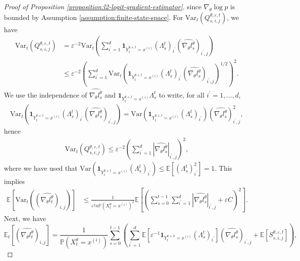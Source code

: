 \documentclass[11pt]{article}
\numberwithin{equation}{section}
\theoremstyle{definition}
\theoremstyle{remark}
\def\eps{\varepsilon}
\def\E{{\bf E}} \def\H{{\bf H}} \def\J{{\bf J}}
\def\var{{\mathrm{Var}}}
\def\bf{{\textbf{f}}}
\def\E{{\mathbb{E}}}
\begin{document}
\begin{proof}[Proof of Proposition \ref{proposition:l2-logit-gradient-estimator}]
since $\nabla_ \theta \log p$ is bounded by Assumption \ref{assumption:finite-state-space}.
For $\var_t ( Q_{s,i,j}^{\theta, \eps, t} )$, we have 
\[
\begin{aligned}
    \var_t \left( Q_{s,i,j}^{\theta, \eps, t} \right) &= \eps^{-2} \var_t \left( \sum_{i^\prime = 1}^d 
    \mathbf 1_{Y_t^{\theta, \eps, t} = x^{(i)}}\left(\Lambda_s^t\right)_{i^\prime} \left(\widehat{\nabla_\theta l_s^\theta}\right)_{i^\prime,j} \right) \\
    & \leq \eps^{-2}\left( \sum_{i^\prime=1}^d \var_t \left( \mathbf 1_{Y_t^{\theta, \eps, t} = x^{(i)}}\left(\Lambda_s^t\right)_{i^\prime} \left(\widehat{\nabla_\theta l_s^\theta}\right)_{i^\prime,j} \right)^{1/2} \right)^2.
\end{aligned}
\]
We use the independence of $\widehat{\nabla_\theta l_s^\theta}$ and $\mathbf 1_{Y_{t}^{\theta, \eps, t} = x^{(i)}} \Lambda_s^t$ to write, for all $i^\prime = 1, \ldots, d$,
\[
\begin{aligned}
    \var_t \left( \mathbf 1_{Y_t^{\theta, \eps, t} = x^{(i)}}\left(\Lambda_s^t\right)_{i^\prime} \left(\widehat{\nabla_\theta l_s^\theta}\right)_{i^\prime,j} \right) = \var \left(\mathbf 1_{Y_t^{\theta, \eps, t} = x^{(i)}}\left(\Lambda_s^t\right)_{i^\prime}\right) \left(\widehat{\nabla_\theta l_s^\theta}\right)^2_{i^\prime,j},
\end{aligned}
\]
hence
\[
\begin{aligned}
     \var_t \left( Q_{s,i,j}^{\theta, \eps, t} \right) \leq \eps^{-2} \left( \sum_{i^\prime = 1}^d \left|\widehat{\nabla_\theta l_s^\theta}\right|_{i^\prime,j}  \right)^2,
\end{aligned}
\]
where we have used that $\var ( \mathbf 1_{Y_t^{\theta, \eps, t} = x^{(i)}}\left(\Lambda_s^t\right)_{i^\prime} ) \leq \mathbb E [(\Lambda_s^t)_{i^\prime}^2 ] = 1$.
This implies
\begin{equation}
\label{eq:exp-of-cond-var-bound}
\begin{aligned}
    \mathbb E \left[ \var_t \left(\left(\widehat{\nabla_\theta l_t^\theta}\right)_{i,j}\right) \right]
    & \leq \frac{1}{\eps^{2}n \mathbb P \left(X_t^\theta = x^{(i)} \right)^2} \mathbb E \left[ \left(\sum_{s = 0}^{t-1} \sum_{i^\prime = 1}^d  \left|\widehat{\nabla_\theta l_s^\theta}\right|_{i^\prime,j}  + \eps C\right)^2 \right].
\end{aligned}
\end{equation}
Next, we have
\[
\mathbb E_t  \left[ \left(\widehat{\nabla_\theta l_t^\theta}\right)_{i,j} \right] 
= \frac{1}{\mathbb P \left(X_t^\theta = x^{(i)} \right)}\sum_{s=0}^{t-1}  \left(\sum_{i^\prime = 1}^d \E \left[ \eps^{-1} \mathbf 1_{Y_t^{\theta, \eps, k} = x^{(i)}} \left(\Lambda_s^t\right)_{i^\prime}\right] \left( \widehat{\nabla_\theta l_s^\theta} \right)_{i^\prime, j} + \E \left[ S_{s,i,j}^{\theta, \eps, t} \right] \right),
\]
\end{proof}
\end{document}
